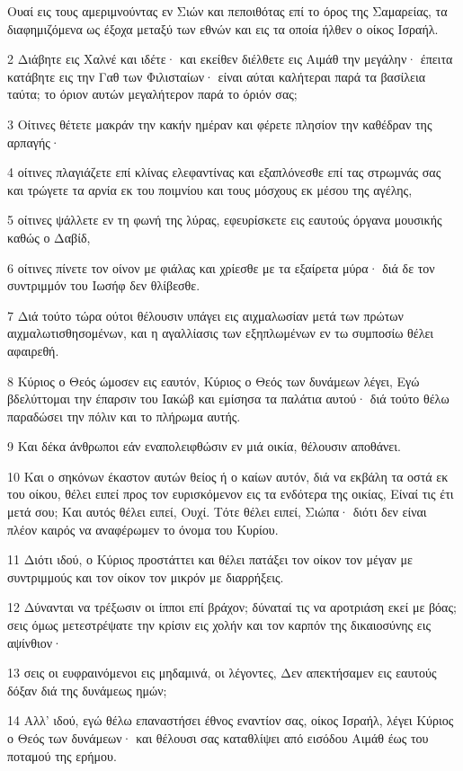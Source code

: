 \par Ουαί εις τους αμεριμνούντας εν Σιών και πεποιθότας επί το όρος της Σαμαρείας, τα διαφημιζόμενα ως έξοχα μεταξύ των εθνών και εις τα οποία ήλθεν ο οίκος Ισραήλ.
\par 2 Διάβητε εις Χαλνέ και ιδέτε· και εκείθεν διέλθετε εις Αιμάθ την μεγάλην· έπειτα κατάβητε εις την Γαθ των Φιλισταίων· είναι αύται καλήτεραι παρά τα βασίλεια ταύτα; το όριον αυτών μεγαλήτερον παρά το όριόν σας;
\par 3 Οίτινες θέτετε μακράν την κακήν ημέραν και φέρετε πλησίον την καθέδραν της αρπαγής·
\par 4 οίτινες πλαγιάζετε επί κλίνας ελεφαντίνας και εξαπλόνεσθε επί τας στρωμνάς σας και τρώγετε τα αρνία εκ του ποιμνίου και τους μόσχους εκ μέσου της αγέλης,
\par 5 οίτινες ψάλλετε εν τη φωνή της λύρας, εφευρίσκετε εις εαυτούς όργανα μουσικής καθώς ο Δαβίδ,
\par 6 οίτινες πίνετε τον οίνον με φιάλας και χρίεσθε με τα εξαίρετα μύρα· διά δε τον συντριμμόν του Ιωσήφ δεν θλίβεσθε.
\par 7 Διά τούτο τώρα ούτοι θέλουσιν υπάγει εις αιχμαλωσίαν μετά των πρώτων αιχμαλωτισθησομένων, και η αγαλλίασις των εξηπλωμένων εν τω συμποσίω θέλει αφαιρεθή.
\par 8 Κύριος ο Θεός ώμοσεν εις εαυτόν, Κύριος ο Θεός των δυνάμεων λέγει, Εγώ βδελύττομαι την έπαρσιν του Ιακώβ και εμίσησα τα παλάτια αυτού· διά τούτο θέλω παραδώσει την πόλιν και το πλήρωμα αυτής.
\par 9 Και δέκα άνθρωποι εάν εναπολειφθώσιν εν μιά οικία, θέλουσιν αποθάνει.
\par 10 Και ο σηκόνων έκαστον αυτών θείος ή ο καίων αυτόν, διά να εκβάλη τα οστά εκ του οίκου, θέλει ειπεί προς τον ευρισκόμενον εις τα ενδότερα της οικίας, Είναί τις έτι μετά σου; Και αυτός θέλει ειπεί, Ουχί. Τότε θέλει ειπεί, Σιώπα· διότι δεν είναι πλέον καιρός να αναφέρωμεν το όνομα του Κυρίου.
\par 11 Διότι ιδού, ο Κύριος προστάττει και θέλει πατάξει τον οίκον τον μέγαν με συντριμμούς και τον οίκον τον μικρόν με διαρρήξεις.
\par 12 Δύνανται να τρέξωσιν οι ίπποι επί βράχον; δύναταί τις να αροτριάση εκεί με βόας; σεις όμως μετεστρέψατε την κρίσιν εις χολήν και τον καρπόν της δικαιοσύνης εις αψίνθιον·
\par 13 σεις οι ευφραινόμενοι εις μηδαμινά, οι λέγοντες, Δεν απεκτήσαμεν εις εαυτούς δόξαν διά της δυνάμεως ημών;
\par 14 Αλλ' ιδού, εγώ θέλω επαναστήσει έθνος εναντίον σας, οίκος Ισραήλ, λέγει Κύριος ο Θεός των δυνάμεων· και θέλουσι σας καταθλίψει από εισόδου Αιμάθ έως του ποταμού της ερήμου.


